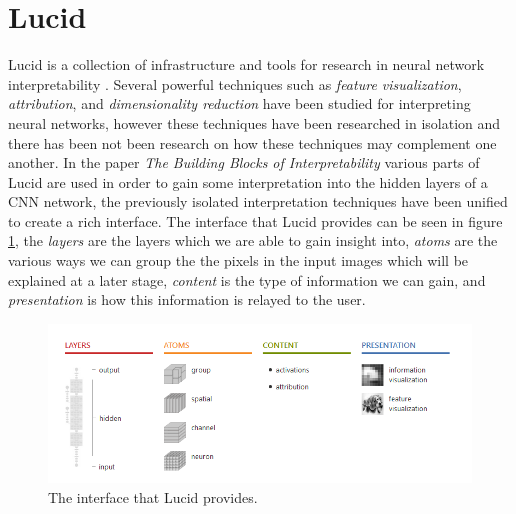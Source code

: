 \section{Lucid}
Lucid is a collection of infrastructure and tools for research in neural network interpretability \cite{Https://github.com/tensorflow/lucid}. Several powerful techniques such as \emph{feature visualization}, \emph{attribution}, and \emph{dimensionality reduction} have been studied for interpreting neural networks, however these techniques have been researched in isolation and there has been not been research on how these techniques may complement one another. In the paper \emph{The Building Blocks of Interpretability} \cite{olah2018the} various parts of Lucid are used in order to gain some interpretation into the hidden layers of a CNN network, the previously isolated interpretation techniques have been unified to create a rich interface. The interface that Lucid provides can be seen in figure \ref{fig:lucid-summary}, the \emph{layers} are the layers which we are able to gain insight into, \emph{atoms} are the various ways we can group the the pixels in the input images which will be explained at a later stage, \emph{content} is the type of information we can gain, and \emph{presentation} is how this information is relayed to the user.
\cite{olah2018the}

\begin  {figure}[!htpb]
  \includegraphics[width=\linewidth]{Evaluation_Images/LUCID_SUM.png}
  \caption{The interface that Lucid provides. \cite{olah2018the}}
  \label{fig:lucid-summary}
\end{figure}



